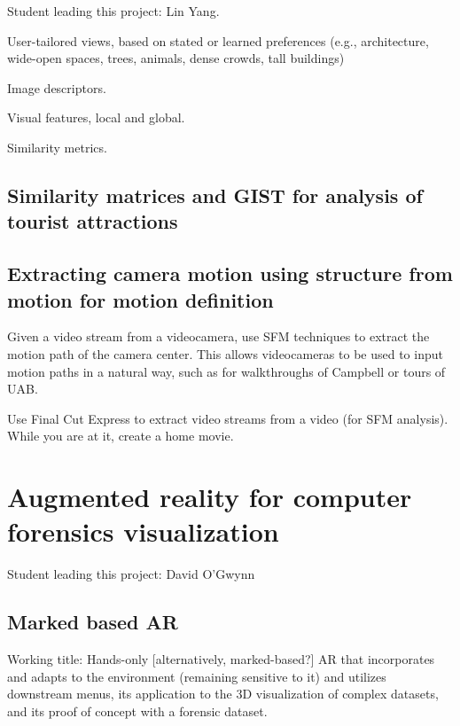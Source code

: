 \documentclass[11pt]{article}
\begin{document}
Student leading this project: Lin Yang.

User-tailored views, based on stated or learned preferences
(e.g., architecture, wide-open spaces, trees, animals, dense crowds, tall buildings)

Image descriptors.

Visual features, local and global.

Similarity metrics.

\subsection{Similarity matrices and GIST for analysis of tourist attractions}


\subsection{Extracting camera motion using structure from motion for motion definition}

Given a video stream from a videocamera,
use SFM techniques to extract the motion path of the camera center.
This allows videocameras to be used to input motion paths in a natural way,
such as for walkthroughs of Campbell or tours of UAB.

Use Final Cut Express to extract video streams from a video (for SFM analysis).
While you are at it, create a home movie.



\section{Augmented reality for computer forensics visualization}

Student leading this project: David O'Gwynn

\subsection{Marked based AR}

Working title: Hands-only [alternatively, marked-based?] AR 
               that incorporates and adapts to the environment (remaining sensitive to it)
               and utilizes downstream menus, 
               its application to the 3D visualization of complex datasets, 
               and its proof of concept with a forensic dataset.
\end{document}
